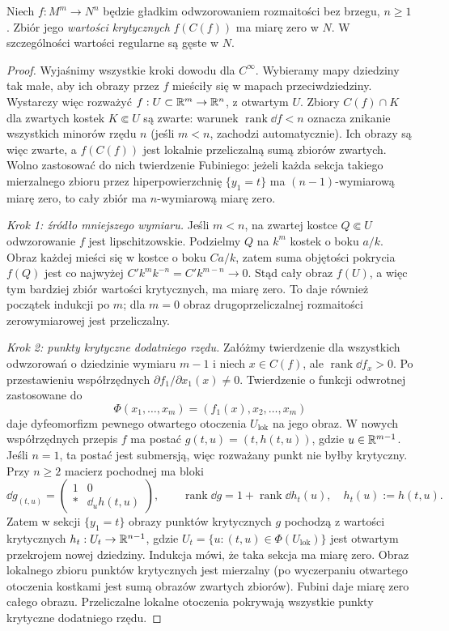 \begin{twierdzenie}
\label{thm:sard}
Niech $f:M^m\to N^n$ będzie gładkim odwzorowaniem
rozmaitości bez brzegu, $n\geq1$. Zbiór jego
\emph{wartości krytycznych} $f(C(f))$ ma miarę zero
w $N$. W szczególności wartości regularne są gęste
w $N$.
\end{twierdzenie}

\begin{proof}
Wyjaśnimy wszystkie kroki dowodu dla $C^\infty$.
Wybieramy mapy dziedziny tak małe, aby ich obrazy przez
$f$ mieściły się w mapach przeciwdziedziny. Wystarczy więc
rozważyć $f:U\subset\mathbb{R}^m\to\mathbb{R}^n$, z otwartym $U$. Zbiory
$C(f)\cap K$ dla zwartych kostek $K\Subset U$
są zwarte: warunek $\operatorname{rank}\dd f<n$
oznacza znikanie wszystkich minorów rzędu $n$
(jeśli $m<n$, zachodzi automatycznie). Ich obrazy
są więc zwarte, a $f(C(f))$ jest lokalnie
przeliczalną sumą zbiorów zwartych. Wolno
zastosować do nich twierdzenie Fubiniego:
jeżeli każda sekcja takiego mierzalnego zbioru
przez hiperpowierzchnię $\{y_1=t\}$ ma
$(n-1)$-wymiarową miarę zero, to cały zbiór
ma $n$-wymiarową miarę zero.

\emph{Krok 1: źródło mniejszego wymiaru.}
Jeśli $m<n$, na zwartej kostce $Q\Subset U$
odwzorowanie $f$ jest lipschitzowskie.
Podzielmy $Q$ na $k^m$ kostek o boku $a/k$.
Obraz każdej mieści się w kostce o boku
$Ca/k$, zatem suma objętości pokrycia
$f(Q)$ jest co najwyżej
$C'k^m k^{-n}=C'k^{m-n}\to0$.
Stąd cały obraz $f(U)$, a więc tym bardziej
zbiór wartości krytycznych, ma miarę zero.
To daje również początek indukcji po $m$;
dla $m=0$ obraz drugoprzeliczalnej
rozmaitości zerowymiarowej jest przeliczalny.

\emph{Krok 2: punkty krytyczne dodatniego rzędu.}
Załóżmy twierdzenie dla wszystkich odwzorowań
o dziedzinie wymiaru $m-1$ i niech
$x\in C(f)$, ale $\operatorname{rank}\dd f_x>0$.
Po przestawieniu współrzędnych
$\partial f_1/\partial x_1(x)\ne0$.
Twierdzenie o funkcji odwrotnej zastosowane do
\[
 \Phi(x_1,\ldots,x_m)
       =(f_1(x),x_2,\ldots,x_m)
\]
daje dyfeomorfizm pewnego otwartego otoczenia $U_{\mathrm{lok}}$
na jego obraz. W nowych współrzędnych
przepis $f$ ma postać
$g(t,u)=(t,h(t,u))$, gdzie $u\in\mathbb{R}^{m-1}$.
Jeśli $n=1$, ta postać jest submersją,
więc rozważany punkt nie byłby krytyczny.
Przy $n\geq2$ macierz pochodnej ma bloki
\[
 \dd g_{(t,u)}
  =\begin{pmatrix}
       1&0\\ *&\dd_u h(t,u)
    \end{pmatrix},
 \qquad
 \operatorname{rank}\dd g
      =1+\operatorname{rank}\dd h_t(u),
 \quad h_t(u):=h(t,u).
\]
Zatem w sekcji $\{y_1=t\}$ obrazy punktów
krytycznych $g$ pochodzą z wartości krytycznych
$h_t:U_t\to\mathbb{R}^{n-1}$, gdzie
$U_t=\{u:(t,u)\in\Phi(U_{\mathrm{lok}})\}$ jest otwartym
przekrojem nowej dziedziny. Indukcja mówi,
że taka sekcja ma miarę zero. Obraz lokalnego
zbioru punktów krytycznych jest mierzalny
(po wyczerpaniu otwartego otoczenia kostkami
jest sumą obrazów zwartych zbiorów).
Fubini daje miarę zero całego obrazu.
Przeliczalne lokalne otoczenia pokrywają
wszystkie punkty krytyczne dodatniego rzędu.


\end{proof}
